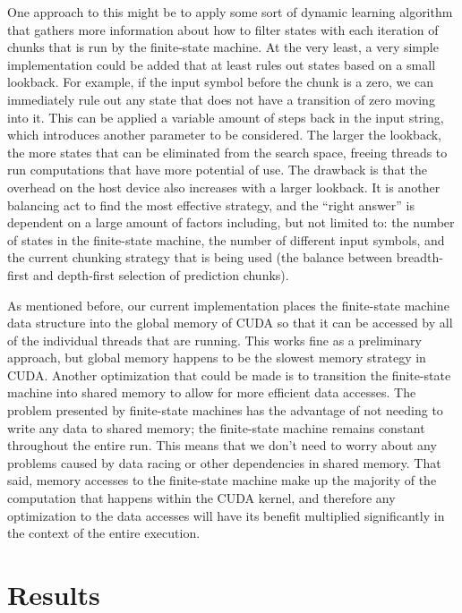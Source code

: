 \documentclass[11pt]{sigplanconf}
\begin{document}
One approach to this might be to apply some sort of dynamic learning algorithm that gathers more information about how to filter states with each iteration of chunks that is run by the finite-state machine. At the very least, a very simple implementation could be added that at least rules out states based on a small lookback. For example, if the input symbol before the chunk is a zero, we can immediately rule out any state that does not have a transition of zero moving into it. This can be applied a variable amount of steps back in the input string, which introduces another parameter to be considered. The larger the lookback, the more states that can be eliminated from the search space, freeing threads to run computations that have more potential of use. The drawback is that the overhead on the host device also increases with a larger lookback. It is another balancing act to find the most effective strategy, and the ``right answer'' is dependent on a large amount of factors including, but not limited to: the number of states in the finite-state machine, the number of different input symbols, and the current chunking strategy that is being used (the balance between breadth-first and depth-first selection of prediction chunks).

As mentioned before, our current implementation places the finite-state machine data structure into the global memory of CUDA so that it can be accessed by all of the individual threads that are running. This works fine as a preliminary approach, but global memory happens to be the slowest memory strategy in CUDA. Another optimization that could be made is to transition the finite-state machine into shared memory to allow for more efficient data accesses. The problem presented by finite-state machines has the advantage of not needing to write any data to shared memory; the finite-state machine remains constant throughout the entire run. This means that we don't need to worry about any problems caused by data racing or other dependencies in shared memory. That said, memory accesses to the finite-state machine make up the majority of the computation that happens within the CUDA kernel, and therefore any optimization to the data accesses will have its benefit multiplied significantly in the context of the entire execution.

\section{Results}
\end{document}
